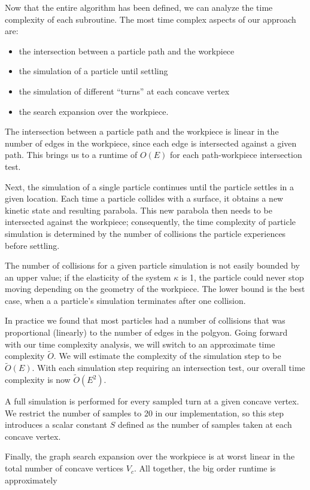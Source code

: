 Now that the entire algorithm has been defined, we can analyze the time complexity of each subroutine. The most time complex aspects of our approach are:

\begin{itemize}
\item the intersection between a particle path and the workpiece
\item the simulation of a particle until settling
\item the simulation of different ``turns'' at each concave vertex
\item the search expansion over the workpiece.
\end{itemize}

The intersection between a particle path and the workpiece is linear in the number of edges in the workpiece, since each edge is intersected against a given path. This brings us to a runtime of $O(E)$ for each path-workpiece intersection test.

Next, the simulation of a single particle continues until the particle settles in a given location. Each time a particle collides with a surface, it obtains a new kinetic state and resulting parabola. This new parabola then needs to be intersected against the workpiece; consequently, the time complexity of particle simulation is determined by the number of collisions the particle experiences before settling.

The number of collisions for a given particle simulation is not easily bounded by an upper value; if the elasticity of the system $\kappa$ is 1, the particle could never stop moving depending on the geometry of the workpiece. The lower bound is the best case, when a a particle's simulation terminates after one collision.

In practice we found that most particles had a number of collisions that was proportional (linearly) to the number of edges in the polgyon. Going forward with our time complexity analysis, we will switch to an approximate time complexity $\tilde{O}$. We will estimate the complexity of the simulation step to be $\tilde{O}(E)$. With each simulation step requiring an intersection test, our overall time complexity is now $\tilde{O}(E^2).$

A full simulation is performed for every sampled turn at a given concave vertex. We restrict the number of samples to 20 in our implementation, so this step introduces a scalar constant $S$ defined as the number of samples taken at each concave vertex.

Finally, the graph search expansion over the workpiece is at worst linear in the total number of concave vertices $V_{c}$. All together, the big order runtime is approximately

 {
  \label{eq:bigo}
}
